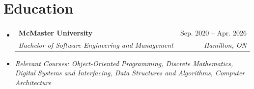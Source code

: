 \documentclass[letterpaper,11pt]{article}
\makeatletter
\newcommand{\resumeSubheading}[4]{
  \vspace{-2pt}\item
    \begin{tabular*}{0.97\textwidth}[t]{l@{\extracolsep{\fill}}r}
      \textbf{#1} & #2 \\
      \textit{\small#3} & \textit{\small #4} \\
    \end{tabular*}\vspace{-7pt}
}
\newcommand{\resumeSubHeadingListStart}{\begin{itemize}[leftmargin=0.15in, label={}]}
\newcommand{\resumeSubHeadingListEnd}{\end{itemize}}
\makeatother
\begin{document}
\section{Education}
\resumeSubHeadingListStart
  \resumeSubheading
    {McMaster University}{Sep. 2020 -- Apr. 2026}
    {Bachelor of Software Engineering and Management}{Hamilton, ON}
    \vspace{-8pt}
    \item\small{
      \textit{Relevant Courses: Object-Oriented Programming, Discrete Mathematics, Digital Systems and Interfacing, Data Structures and Algorithms, Computer Architecture}
    }
\resumeSubHeadingListEnd
\end{document}

